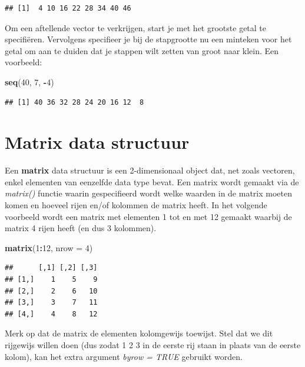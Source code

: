 \documentclass[
]{book}
\newenvironment{Shaded}{\begin{snugshade}}{\end{snugshade}}
\newcommand{\AttributeTok}[1]{\textcolor[rgb]{0.13,0.29,0.53}{#1}}
\newcommand{\DecValTok}[1]{\textcolor[rgb]{0.00,0.00,0.81}{#1}}
\newcommand{\FunctionTok}[1]{\textcolor[rgb]{0.13,0.29,0.53}{\textbf{#1}}}
\newcommand{\NormalTok}[1]{#1}
\newcommand{\SpecialCharTok}[1]{\textcolor[rgb]{0.81,0.36,0.00}{\textbf{#1}}}
\begin{document}
\begin{verbatim}
## [1]  4 10 16 22 28 34 40 46
\end{verbatim}

Om een aftellende vector te verkrijgen, start je met het grootste getal te specifiëren. Vervolgens specifieer je bij de stapgrootte nu een minteken voor het getal om aan te duiden dat je stappen wilt zetten van groot naar klein. Een voorbeeld:

\begin{Shaded}
\begin{Highlighting}[]
\FunctionTok{seq}\NormalTok{(}\DecValTok{40}\NormalTok{, }\DecValTok{7}\NormalTok{, }\SpecialCharTok{{-}}\DecValTok{4}\NormalTok{)}
\end{Highlighting}
\end{Shaded}

\begin{verbatim}
## [1] 40 36 32 28 24 20 16 12  8
\end{verbatim}

\hypertarget{matrix-data-structuur}{%
\section{Matrix data structuur}\label{matrix-data-structuur}}

Een \textbf{matrix} data structuur is een 2-dimensionaal object dat, net zoals vectoren, enkel elementen van eenzelfde data type bevat. Een matrix wordt gemaakt via de \emph{matrix()} functie waarin gespecifieerd wordt welke waarden in de matrix moeten komen en hoeveel rijen en/of kolommen de matrix heeft.
In het volgende voorbeeld wordt een matrix met elementen 1 tot en met 12 gemaakt waarbij de matrix 4 rijen heeft (en dus 3 kolommen).

\begin{Shaded}
\begin{Highlighting}[]
\FunctionTok{matrix}\NormalTok{(}\DecValTok{1}\SpecialCharTok{:}\DecValTok{12}\NormalTok{, }\AttributeTok{nrow =} \DecValTok{4}\NormalTok{)}
\end{Highlighting}
\end{Shaded}

\begin{verbatim}
##      [,1] [,2] [,3]
## [1,]    1    5    9
## [2,]    2    6   10
## [3,]    3    7   11
## [4,]    4    8   12
\end{verbatim}

Merk op dat de matrix de elementen kolomgewijs toewijst. Stel dat we dit rijgewijs willen doen (dus zodat 1 2 3 in de eerste rij staan in plaats van de eerste kolom), kan het extra argument \emph{byrow = TRUE} gebruikt worden.
\end{document}
